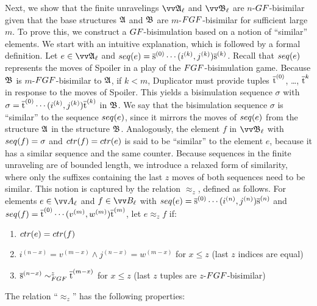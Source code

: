Next, we show that the finite unravelings $\unravel{A}_{\ell}$ and $\unravel{B}_{\ell}$ are $n$-$\GF$-bisimilar given that the base structures ${\mathfrak{A}}$ and ${\mathfrak{B}}$ are $m$-$\FGF$-bisimilar for sufficient large $m$.
To prove this, we construct a $\GF$-bisimulation based on a notion of ``similar'' elements.
We start with an intuitive explanation, which is followed by a formal definition.
Let $e \in \unravel{A}_{\ell}$ and $\seq{e} = \elemtuples^{(0)}\cdots(i^{(k)}, j^{(k)})\elemtuples^{(k)}$.
Recall that $\seq{e}$ represents the moves of Spoiler in a play of the $\FGF$-bisimulation game.
Because ${\mathfrak{B}}$ is $m$-$\FGF$-bisimilar to ${\mathfrak{A}}$, if $k < m$, Duplicator must provide tuples $\overline{\mathrm{t}}^{(0)}$, \ldots, $\overline{\mathrm{t}}^{{k}}$ in response to the moves of Spoiler.
This yields a bisimulation sequence $\sigma$ with $\sigma = \overline{\mathrm{t}}^{(0)}\cdots(i^{(k)}, j^{(k)})\overline{\mathrm{t}}^{(k)}$ in ${\mathfrak{B}}$.
We say that the bisimulation sequence $\sigma$ is ``similar'' to the sequence $\seq{e}$, since it mirrors the moves of $\seq{e}$ from the structure ${\mathfrak{A}}$ in the structure ${\mathfrak{B}}$.
Analogously, the element $f$ in $\unravel{B}_{\ell}$ with $\seq{f} = \sigma$ and $\ctr{f} = \ctr{e}$ is said to be ``similar'' to the element $e$, because it has a similar sequence and the same counter.
Because sequences in the finite unraveling are of bounded length, we introduce a relaxed form of similarity, where only the suffixes containing the last $z$ moves of both sequences need to be similar.
This notion is captured by the relation $\approx_{z}$, defined as follows.
For elements $e \in \unraveldom{A}_{\ell}$ and $f \in \unraveldom{B}_{\ell}$ with $\seq{e} = \elemtuples^{(0)}\cdots(i^{(n)}, j^{(n)})\elemtuples^{(n)}$ and $\seq{f} = \elemtuplet^{(0)}\cdots(v^{(m)}, w^{(m)})\elemtuplet^{(m)}$, let $e \approx_{z} f$ if:
\begin{enumerate}
  \item $\ctr{e} = \ctr{f}$
  \item $i^{(n-x)} = v^{(m-x)} \wedge j^{(n-x)} = w^{(m-x)}$ for $x \le z$ (last $z$ indices are equal)
  \item $\elemtuples^{(n-x)} \bisimto_{\FGF}^{z} \elemtuplet^{(m-x)}$ for $x \le z$ (last $z$ tuples are $z$-$\FGF$-bisimilar)
\end{enumerate}

The relation ``$\approx_{z}$'' has the following properties:

